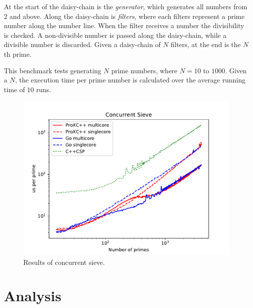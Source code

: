 At the start of the daisy\hyp{}chain is the \textit{generator}, which generates all numbers from $2$ and above. Along the daisy\hyp{}chain is \textit{filters}, where each filters represent a prime number along the number line. When the filter receives a number the divisibility is checked. A non\hyp{}divisible number is passed along the daisy\hyp{}chain, while a divisible number is discarded. Given a daisy\hyp{}chain of $N$ filters, at the end is the $N$th prime.

This benchmark tests generating $N$ prime numbers, where $N=10$ to $1000$. Given a $N$, the execution time per prime number is calculated over the average running time of $10$ runs.

\begin{figure}[h!]
    \centering
    \includegraphics[width=0.8\linewidth]{fig/concurrent_sieve}
    \caption{Results of concurrent sieve.}
    \label{fig:concurrent_sieve}
\end{figure}


\section{Analysis}
\label{sec:analysis}


